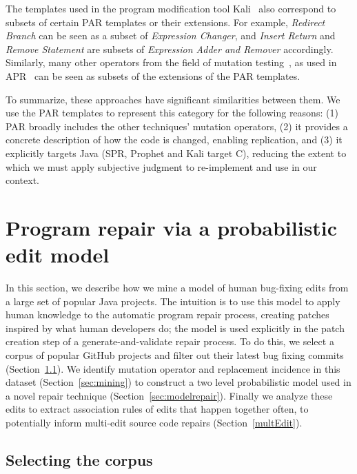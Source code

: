 \documentclass[conference]{IEEEtran}
\begin{document}
The templates used in the program modification tool Kali~\cite{Qi15}
also correspond to subsets of certain PAR templates or their extensions. 
For example, \emph{Redirect Branch} can be seen as
a subset of \emph{Expression Changer}, and \emph{Insert Return} and \emph{Remove Statement} are
subsets of \emph{Expression Adder and Remover} accordingly. Similarly,
many other operators from the field of mutation testing~\cite{Offutt06}, as used in
APR~\cite{debroy10,xuan16} can be seen as subsets of the extensions of the 
PAR templates.  

To summarize, these approaches have significant similarities between them.  We use the PAR templates to represent this category
for the following reasons: (1) PAR broadly includes the other techniques' mutation operators, (2) it
provides a concrete description of how the code is changed, enabling
replication, and (3) it explicitly targets Java (SPR, Prophet and Kali
target C), reducing the extent to which we must apply subjective judgment to re-implement and use in our context.

\section{Program repair via a probabilistic edit model} \label{buildingTheModel}

In this section, we describe how we mine a model of human
bug-fixing edits from a large set of popular Java projects. The intuition is to
use this model to
apply human knowledge to the automatic program repair process, 
creating patches inspired by what human developers do; the model is used
explicitly in the patch creation step of a generate-and-validate repair process. To do this, we
select a corpus of popular GitHub projects and filter out their latest bug
fixing commits (Section~\ref{sec:corpus}).  We identify mutation operator and
replacement incidence in this dataset  (Section~\ref{sec:mining}) to construct a two level probabilistic
model used in a novel repair technique (Section~\ref{sec:modelrepair}). Finally we
analyze these edits to extract association rules of 
edits that happen together often, to potentially inform multi-edit source
code repairs (Section~\ref{multEdit}).

\subsection{Selecting the corpus}
\label{sec:corpus}
\end{document}
